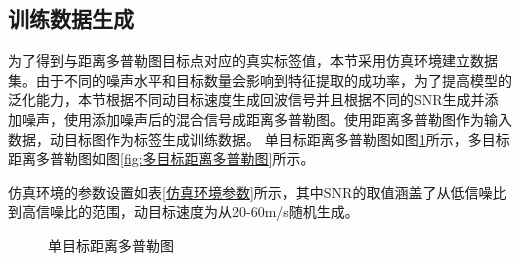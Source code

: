 \subsection{训练数据生成} \label{训练数据生成}
为了得到与距离多普勒图目标点对应的真实标签值，本节采用仿真环境建立数据集。由于不同的噪声水平和目标数量会影响到特征提取的成功率，为了提高模型的泛化能力，本节根据不同动目标速度生成回波信号并且根据不同的SNR生成并添加噪声，使用添加噪声后的混合信号成距离多普勒图。使用距离多普勒图作为输入数据，动目标图作为标签生成训练数据。
单目标距离多普勒图如图\ref{fig:单目标距离多普勒图}所示，多目标距离多普勒图如图\ref{fig:多目标距离多普勒图}所示。

仿真环境的参数设置如表\ref{仿真环境参数}所示，其中SNR的取值涵盖了从低信噪比到高信噪比的范围，动目标速度为从20-60m/s随机生成。
\begin{figure}[htbp]
	\centering
	\caption{单目标距离多普勒图}
	\label{fig:单目标距离多普勒图}
\end{figure}

